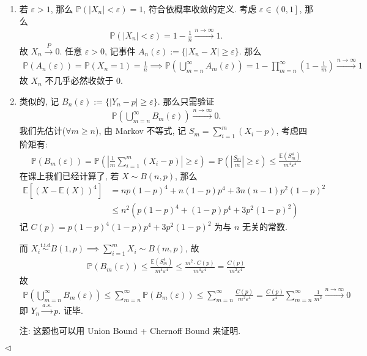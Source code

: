 \documentclass[11pt]{article}
\newenvironment{answer}[1][Solution]{\begin{trivlist}
    \item[\hskip \labelsep {\bfseries #1.}\hskip \labelsep]}{\hfill$\lhd$\end{trivlist}}
\newcommand\1{\mathds{1}}
\newcommand\E{\mathbb{E}}
\newcommand\PP{\mathbb{P}}
\newcommand{\arrp}{\xrightarrow{P}}
\newcommand{\arras}{\xrightarrow{a.s.}}
\newcommand{\arri}{\xrightarrow{n\rightarrow\infty}}
\newcommand{\iid}{\overset{\text{i.i.d}}{\sim}}
\begin{document}
\begin{answer}
    \begin{enumerate}[label=(\arabic*)]
        \item 若 $\varepsilon > 1$, 那么 $\PP(|X_n| < \varepsilon) = 1$, 符合依概率收敛的定义. 考虑 $\varepsilon \in \left(0,1\right]$, 那么
        \begin{align*}
            \PP(|X_n| < \varepsilon) = 1 - \frac{1}{n} \arri 1.
        \end{align*}
        故 $X_n \arrp 0$. 任意 $\varepsilon > 0$, 记事件 $A_n(\varepsilon) := \{|X_n - X| \ge \varepsilon\}$. 那么
        \begin{align*}
            \PP(A_n(\varepsilon)) = \PP(X_n = 1) = \frac{1}{n} \implies \PP\left(\bigcup_{m=n}^\infty A_m(\varepsilon)\right) = 1 - \prod_{m=n}^{\infty} \left(1 - \frac{1}{m}\right) \arri 1
        \end{align*}
        故 $X_n$ 不几乎必然收敛于 $0$.
        \item 类似的, 记 $B_n(\varepsilon) := \{|Y_n - p| \ge \varepsilon\}$. 那么只需验证
        \begin{align*}
            \PP\left( \bigcup_{m=n}^\infty B_m(\varepsilon) \right) \arri 0.
        \end{align*}
        我们先估计($\forall m \ge n$), 由 Markov 不等式, 记 $S_m = \sum_{i=1}^{m}(X_i - p)$, 考虑四阶矩有: 
        \begin{align*}
            \PP(B_m(\varepsilon)) = \PP\left(\left|\frac{1}{m} \sum_{i=1}^m (X_i - p)\right|  \ge \varepsilon\right) = \PP\left(\left|\frac{S_m}{m}\right| \ge \varepsilon \right) \le \frac{\E(S_m^4)} {m^4\varepsilon^4} 
        \end{align*}
        在课上我们已经计算了, 若 $X\sim B(n, p)$, 那么
        \begin{align*}
            \E[(X - \E(X))^4] &= np(1-p)^4+n(1-p) p^4+3n(n-1) p^2 (1-p)^2 \\
            &\le n^2 \left(p(1-p)^4 + (1-p)p^4 + 3p^2(1-p)^2\right) 
        \end{align*}
        记 $C(p) = p(1-p)^4 (1-p)p^4 + 3p^2(1-p)^2$ 为与 $n$ 无关的常数.

        而 $X_i \iid B(1,p) \implies \sum_{i=1}^{m}X_i \sim B(m, p)$, 故
        \begin{align*}
            \PP(B_m(\varepsilon)) \le \frac{\E(S_m^4)}{m^4\varepsilon^4} \le \frac{m^2 \cdot C(p)}{m^4 \varepsilon^4} = \frac{C(p)}{m^2 \varepsilon^4} 
        \end{align*}
        故
        \begin{align*}
            \PP\left( \bigcup_{m=n}^\infty B_m(\varepsilon) \right) \le \sum_{m=n}^\infty\PP(B_m(\varepsilon)) \le \sum_{m=n}^\infty \frac{C(p)}{m^2 \varepsilon^4}  = \frac{C(p)}{\varepsilon^4} \sum_{m=n}^\infty \frac{1}{m^2} \arri 0
        \end{align*}
        即 $Y_n \arras p$. 证毕.

        注: 这题也可以用 Union Bound + Chernoff Bound 来证明. 
    \end{enumerate}
\end{answer}
\end{document}
